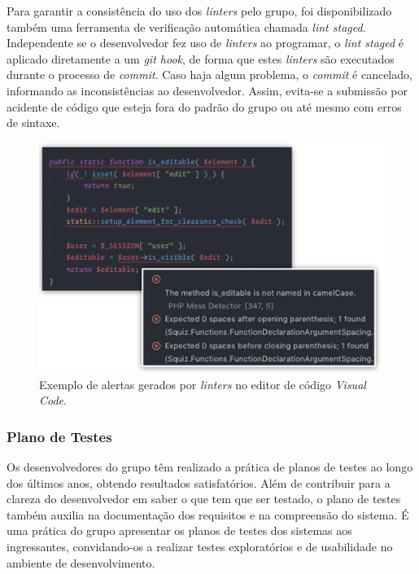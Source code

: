 Para garantir a consistência do uso dos \emph{linters} pelo grupo, foi disponibilizado também uma ferramenta de verificação automática chamada \emph{lint staged}. Independente se o desenvolvedor fez uso de \emph{linters} ao programar, o \emph{lint staged} é aplicado diretamente a um \emph{git hook}, de forma que estes \emph{linters} são executados durante o processo de \emph{commit}. Caso haja algum problema, o \emph{commit} é cancelado, informando as inconsistências ao desenvolvedor. Assim, evita-se a submissão por acidente de código que esteja fora do padrão do grupo ou até mesmo com erros de sintaxe.

\begin{figure}[H]
    \centering
    \includegraphics[width=15cm]{source/4-solucao/images/validores-sintaxe.png}
    \caption{Exemplo de alertas gerados por \emph{linters} no editor de código \emph{Visual Code}.}
    \label{fig:validores-sintaxe}
\end{figure}

\hypertarget{plano-de-testes}{%
\subsubsection{Plano de Testes}\label{plano-de-testes}}

Os desenvolvedores do grupo têm realizado a prática de planos de testes ao longo dos últimos anos, obtendo resultados satisfatórios. Além de contribuir para a clareza do desenvolvedor em saber o que tem que ser testado, o plano de testes também auxilia na documentação dos requisitos e na compreensão do sistema. É uma prática do grupo apresentar os planos de testes dos sistemas aos ingressantes, convidando-os a realizar testes exploratórios e de usabilidade no ambiente de desenvolvimento.

